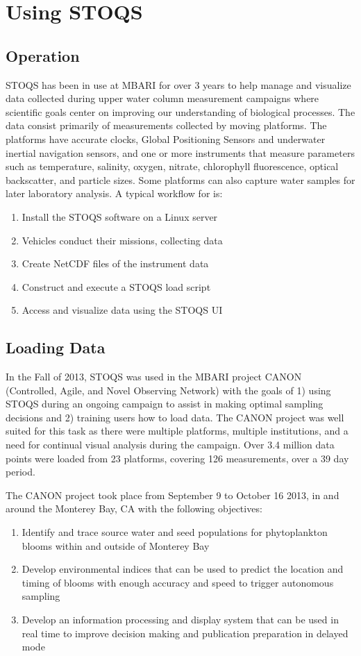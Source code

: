 \documentclass[conference]{IEEEtran}
\begin{document}
\section{Using STOQS}

\subsection{Operation}

STOQS has been in use at MBARI for over 3 years to help manage and visualize data collected during upper water column measurement campaigns where scientific goals center on improving our understanding of biological processes. The data consist primarily of measurements collected by moving platforms. The platforms have accurate clocks, Global Positioning Sensors and underwater inertial navigation sensors, and one or more instruments that measure parameters such as temperature, salinity, oxygen, nitrate, chlorophyll fluorescence, optical backscatter, and particle sizes. Some platforms can also capture water samples for later laboratory analysis. A typical workflow for is:
\begin{enumerate}
\item Install the STOQS software on a Linux server
\item Vehicles conduct their missions, collecting data
\item Create NetCDF files of the instrument data
\item Construct and execute a STOQS load script
\item Access and visualize data using the STOQS UI
\end{enumerate}


\subsection{Loading Data}

In the Fall of 2013, STOQS was used in the MBARI project CANON (Controlled, Agile, and Novel Observing Network) with the goals of 1) using STOQS during an ongoing campaign to assist in making optimal sampling decisions and 2) training users how to load data.  The CANON project was well suited for this task as there were multiple platforms, multiple institutions, and a need for continual visual analysis during the campaign.  Over 3.4 million data points were loaded from 23 platforms, covering 126 measurements, over a 39 day period. 

The CANON project took place from September 9 to October 16 2013, in and around the Monterey Bay, CA with the following objectives: 
\begin{enumerate}
\item Identify and trace source water and seed populations for phytoplankton blooms within and outside of Monterey Bay
\item Develop environmental indices that can be used to predict the location and timing of blooms with enough accuracy and speed to trigger autonomous sampling
\item Develop an information processing and display system that can be used in real time to improve decision making and publication preparation in delayed mode
\end{enumerate}
\end{document}
